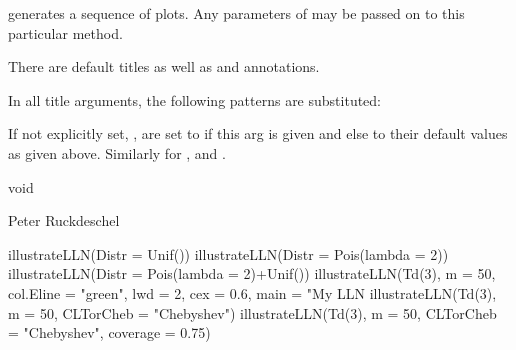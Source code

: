 \documentclass{article}
\begin{document}
\begin{Details}\relax
{} generates a sequence of plots.
Any parameters of  may be passed on to this particular
 method. 

There are default  titles as well as  and 
annotations.

In all title arguments, the following patterns are substituted:

If not explicitly set, ,  are set 
to  if this arg is given and else to their default values as given
above. Similarly for ,  and .
\end{Details}
\begin{Value}
void
\end{Value}
\begin{Author}\relax
Peter Ruckdeschel 
\end{Author}
\begin{Examples}
\begin{ExampleCode}
illustrateLLN(Distr = Unif())
illustrateLLN(Distr = Pois(lambda = 2))
illustrateLLN(Distr = Pois(lambda = 2)+Unif())
illustrateLLN(Td(3), m = 50, col.Eline = "green", lwd = 2, cex = 0.6, main = 
 "My LLN %
illustrateLLN(Td(3), m = 50, CLTorCheb = "Chebyshev") 
illustrateLLN(Td(3), m = 50, CLTorCheb = "Chebyshev", coverage = 0.75) 
\end{ExampleCode}
\end{Examples}
\end{document}
